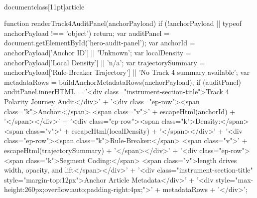 \\documentclass[11pt]{article}
\begin{document}
\begin{CodeBlock}
{{{{{{        function renderTrack4AuditPanel(anchorPayload) {{
            if (!anchorPayload || typeof anchorPayload !== 'object') return;
            var auditPanel = document.getElementById('hero-audit-panel');
            var anchorId = anchorPayload['Anchor ID'] || 'Unknown';
            var localDensity = anchorPayload['Local Density'] || 'n/a';
            var trajectorySummary = anchorPayload['Rule-Breaker Trajectory'] || 'No Track 4 summary available';
            var metadataRows = buildAnchorMetadataRows(anchorPayload);
            if (auditPanel) {{
                auditPanel.innerHTML = '<div class="instrument-section-title">Track 4 Polarity Journey Audit</div>' +
                                       '<div class="ep-row"><span class="k">Anchor:</span> <span class="v">' + escapeHtml(anchorId) + '</span></div>' +
                                       '<div class="ep-row"><span class="k">Density:</span> <span class="v">' + escapeHtml(localDensity) + '</span></div>' +
                                       '<div class="ep-row"><span class="k">Rule-Breaker:</span> <span class="v">' + escapeHtml(trajectorySummary) + '</span></div>' +
                                       '<div class="ep-row"><span class="k">Segment Coding:</span> <span class="v">length drives width, opacity, and lift</span></div>' +
                                       '<div class="instrument-section-title" style="margin-top:12px">Anchor Article Metadata</div>' +
                                       '<div style="max-height:260px;overflow:auto;padding-right:4px;">' + metadataRows + '</div>';
            }}
        }}

}}}}}}
\end{CodeBlock}
\end{document}
